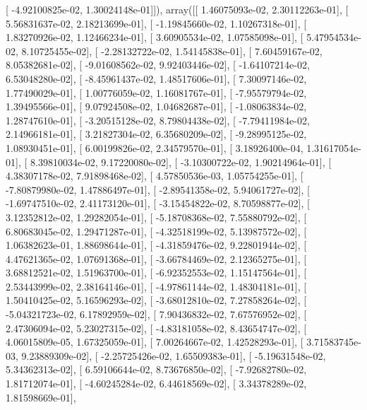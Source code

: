 \documentclass{article}
\begin{document}
       [ -4.92100825e-02,   1.30024148e-01]]), array([[  1.46075093e-02,   2.30112263e-01],
       [  5.56831637e-02,   2.18213699e-01],
       [ -1.19845660e-02,   1.10267318e-01],
       [  1.83270926e-02,   1.12466234e-01],
       [  3.60905534e-02,   1.07585098e-01],
       [  5.47954534e-02,   8.10725455e-02],
       [ -2.28132722e-02,   1.54145838e-01],
       [  7.60459167e-02,   8.05382681e-02],
       [ -9.01608562e-02,   9.92403446e-02],
       [ -1.64107214e-02,   6.53048280e-02],
       [ -8.45961437e-02,   1.48517606e-01],
       [  7.30097146e-02,   1.77490029e-01],
       [  1.00776059e-02,   1.16081767e-01],
       [ -7.95579794e-02,   1.39495566e-01],
       [  9.07924508e-02,   1.04682687e-01],
       [ -1.08063834e-02,   1.28747610e-01],
       [ -3.20515128e-02,   8.79804438e-02],
       [ -7.79411984e-02,   2.14966181e-01],
       [  3.21827304e-02,   6.35680209e-02],
       [ -9.28995125e-02,   1.08930451e-01],
       [  6.00199826e-02,   2.34579570e-01],
       [  3.18926400e-04,   1.31617054e-01],
       [  8.39810034e-02,   9.17220080e-02],
       [ -3.10300722e-02,   1.90214964e-01],
       [  4.38307178e-02,   7.91898468e-02],
       [  4.57850536e-03,   1.05754255e-01],
       [ -7.80879980e-02,   1.47886497e-01],
       [ -2.89541358e-02,   5.94061727e-02],
       [ -1.69747510e-02,   2.41173120e-01],
       [ -3.15454822e-02,   8.70598877e-02],
       [  3.12352812e-02,   1.29282054e-01],
       [ -5.18708368e-02,   7.55880792e-02],
       [  6.80683045e-02,   1.29471287e-01],
       [ -4.32518199e-02,   5.13987572e-02],
       [  1.06382623e-01,   1.88698644e-01],
       [ -4.31859476e-02,   9.22801944e-02],
       [  4.47621365e-02,   1.07691368e-01],
       [ -3.66784469e-02,   2.12365275e-01],
       [  3.68812521e-02,   1.51963700e-01],
       [ -6.92352553e-02,   1.15147564e-01],
       [  2.53443999e-02,   2.38164146e-01],
       [ -4.97861144e-02,   1.48304181e-01],
       [  1.50410425e-02,   5.16596293e-02],
       [ -3.68012810e-02,   7.27858264e-02],
       [ -5.04321723e-02,   6.17892959e-02],
       [  7.90436832e-02,   7.67576952e-02],
       [  2.47306094e-02,   5.23027315e-02],
       [ -4.83181058e-02,   8.43654747e-02],
       [  4.06015809e-05,   1.67325059e-01],
       [  7.00264667e-02,   1.42528293e-01],
       [  3.71583745e-03,   9.23889309e-02],
       [ -2.25725426e-02,   1.65509383e-01],
       [ -5.19631548e-02,   5.34362313e-02],
       [  6.59106644e-02,   8.73676850e-02],
       [ -7.92682780e-02,   1.81712074e-01],
       [ -4.60245284e-02,   6.44618569e-02],
       [  3.34378289e-02,   1.81598669e-01],
\end{document}
